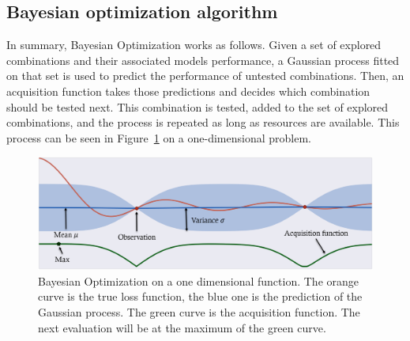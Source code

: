 \subsection{Bayesian optimization algorithm}

In summary, Bayesian Optimization works as follows. Given a set of explored combinations and their associated models performance, a Gaussian process fitted on that set is used to predict the performance of untested combinations. Then, an acquisition function takes those predictions and decides which combination should be tested next. This combination is tested, added to the set of explored combinations, and the process is repeated as long as resources are available. This process can be seen in Figure~\ref{fig:bo} on a one-dimensional problem. 

\begin{figure}[htb]
	\centering
	\includegraphics[width=\linewidth]{img_hyperopt/bo.png}
	\caption{Bayesian Optimization on a one dimensional function. The orange curve is the true loss function, the blue one is the prediction of the Gaussian process. The green curve is the acquisition function. The next evaluation will be at the maximum of the green curve.}
	\label{fig:bo}
\end{figure}



